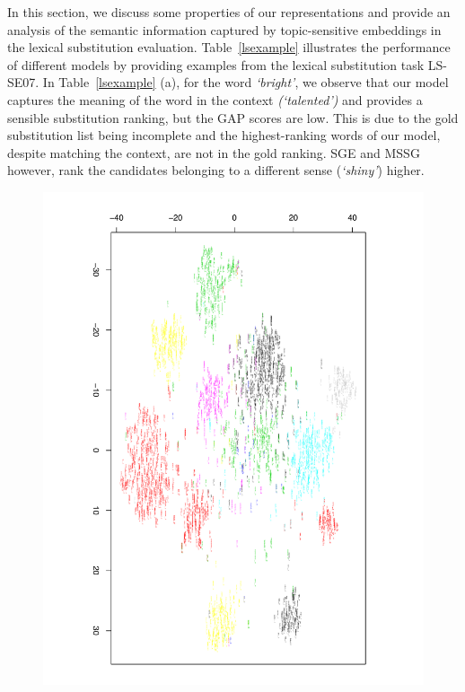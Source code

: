 In this section, we discuss some properties of our representations and provide an analysis of the semantic information captured by topic-sensitive embeddings in the lexical substitution evaluation. 
Table~\ref{lsexample} illustrates the performance of different models by providing examples from the lexical substitution task LS-SE07. 
In Table~\ref{lsexample} (a), for the word \textit{`bright'}, we observe that our model captures the meaning of the word in the context \textit{(`talented')} and provides a sensible substitution ranking, but the GAP scores are low. 
This is due to the gold substitution list being incomplete and the highest-ranking words of our model, despite matching the context, are not in the gold ranking. SGE and MSSG however, rank the candidates belonging to a different sense (\textit{`shiny'}) higher. 


   
    \begin{figure}   
\centering
\includegraphics[scale=0.7]{03-research-01/figs/vecvis-rotated.pdf} 
  \label{vecvis}
   \end{figure}
   
